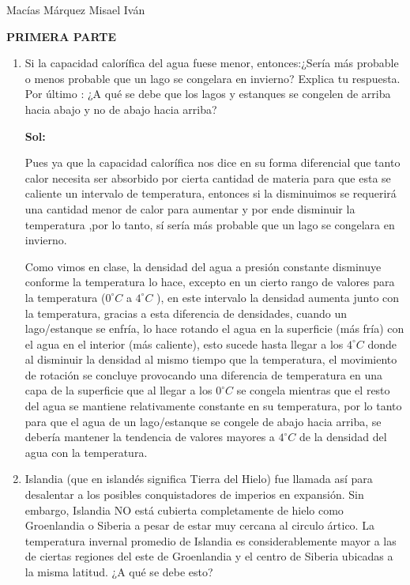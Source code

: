 \documentclass[12pt,a4paper]{article}
\begin{document}
Macías Márquez Misael Iván


\textbf{PRIMERA PARTE}

\begin{enumerate}






\item Si la capacidad calorífica del agua fuese menor, entonces:¿Sería más probable o menos probable que un lago se congelara en invierno? Explica tu respuesta. Por último : ¿A qué se debe que los lagos y estanques se congelen de arriba hacia abajo y no de abajo hacia arriba?

\textbf{Sol:}

Pues ya que la capacidad calorífica nos dice en su forma diferencial que tanto calor necesita ser absorbido por cierta cantidad de materia para que esta se caliente un intervalo de temperatura, entonces si la disminuimos se requerirá una cantidad menor de calor para aumentar y por ende disminuir la temperatura ,por lo tanto, sí sería más probable que un lago se congelara en invierno.

Como vimos en clase, la densidad del agua a presión constante disminuye conforme la temperatura lo hace, excepto en un cierto rango de valores para la temperatura ($0^{\circ}C$ a $4^{\circ}C$ ), en este intervalo la densidad aumenta junto con la temperatura, gracias a esta diferencia de densidades, cuando un lago/estanque se enfría, lo hace rotando el agua en la superficie (más fría) con el agua en el interior (más caliente), esto sucede hasta llegar a los $4^{\circ}C$ donde al disminuir la densidad al mismo tiempo que la temperatura, el movimiento de rotación se concluye provocando una diferencia de temperatura en una capa de la superficie que al llegar a los $0^{\circ}C$ se congela mientras que el resto del agua se mantiene relativamente constante en su temperatura, por lo tanto para que el agua de un lago/estanque se congele de abajo hacia arriba, se debería mantener la tendencia de valores mayores a $4^{\circ}C$ de la densidad del agua con la temperatura. 







\item Islandia (que en islandés significa Tierra del Hielo) fue llamada así para desalentar a los posibles conquistadores de imperios en expansión. Sin embargo, Islandia NO está cubierta completamente de hielo como Groenlandia o Siberia a pesar de estar muy cercana al circulo ártico. La temperatura invernal promedio de Islandia es considerablemente mayor a las de ciertas regiones del este de Groenlandia y el centro de Siberia ubicadas a la misma latitud. ¿A qué se debe esto?


\end{enumerate}
\end{document}

